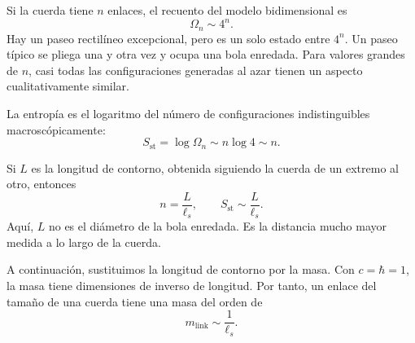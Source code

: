 Si la cuerda tiene \(n\) enlaces, el recuento del modelo bidimensional es
\begin{equation}
\Omega_n\sim4^n.
\label{eq:l06-walk-count}
\end{equation}
Hay un paseo rectilíneo excepcional, pero es un solo estado entre \(4^n\). Un paseo típico se pliega una y otra vez y ocupa una bola enredada. Para valores grandes de \(n\), casi todas las configuraciones generadas al azar tienen un aspecto cualitativamente similar.

La entropía es el logaritmo del número de configuraciones indistinguibles macroscópicamente:
\begin{equation}
S_{\mathrm{st}}=\log\Omega_n\sim n\log4\sim n.
\label{eq:l06-string-entropy-n}
\end{equation}

\begin{classroomqa}\end{classroomqa}

Si \(L\) es la longitud de contorno, obtenida siguiendo la cuerda de un extremo al otro, entonces
\begin{equation}
n=\frac{L}{\ell_s},
\qquad
S_{\mathrm{st}}\sim\frac{L}{\ell_s}.
\label{eq:l06-string-entropy-length}
\end{equation}
Aquí, \(L\) no es el diámetro de la bola enredada. Es la distancia mucho mayor medida a lo largo de la cuerda.

A continuación, sustituimos la longitud de contorno por la masa. Con \(c=\hbar=1\), la masa tiene dimensiones de inverso de longitud. Por tanto, un enlace del tamaño de una cuerda tiene una masa del orden de
\begin{equation}
m_{\mathrm{link}}\sim\frac{1}{\ell_s}.
\label{eq:l06-link-mass}
\end{equation}

\begin{classroomqa}\end{classroomqa}

